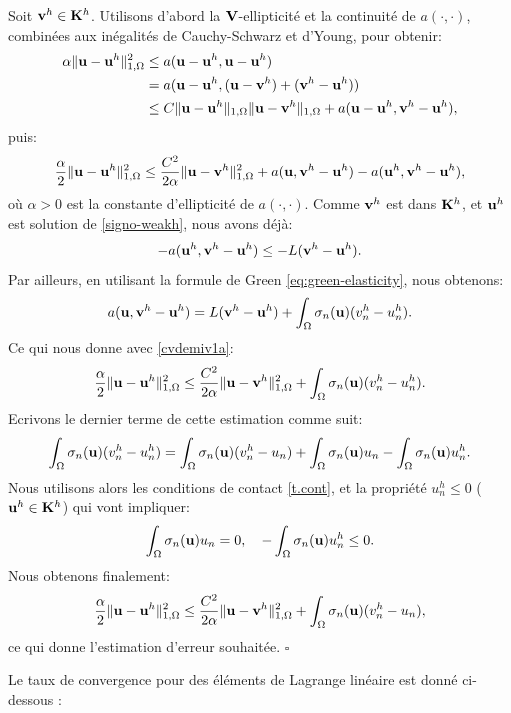 \documentclass[11pt]{book}
\newcommand{\cqfd}{{$\mbox{}$\hfill$\square$}}
\def\u{{\bf u}}
\def\vv{{\bf v}}
\def\V{{\bf V}}
\def\K{{\bf K}}
\begin{document}
\proof
Soit $\vv^h \in \K^h$. Utilisons d'abord la
$\V$-ellipticité et la continuité de $a(\cdot,\cdot)$, combinées aux inégalités de Cauchy-Schwarz et d'Young, pour obtenir:
\begin{align*}
\alpha \| \u - \u^h \|^2_{1,\Omega} &
\leq a ( \u - \u^h , \u - \u^h ) \nonumber \\
& =  a ( \u - \u^h , (\u - \vv^h) + (\vv^h - \u^h) ) \nonumber \\
& \leq C \| \u - \u^h \|_{1,\Omega} \| \u - \vv^h \|_{1,\Omega} + a ( \u - \u^h , \vv^h - \u^h ), %
\end{align*}
puis:
\begin{equation}
\frac\alpha2 \| \u - \u^h \|^2_{1,\Omega} 
\leq %
\frac{C^2}{2\alpha} \| \u - \vv^h \|^2_{1,\Omega}
 + a ( \u  , \vv^h - \u^h )
 - a ( \u^h , \vv^h - \u^h ), \label{cvdemiv1a}
\end{equation}
où $\alpha > 0$ est la constante d'ellipticité de $a(\cdot,\cdot)$. 
Comme $\vv^h$ est dans $\K^h$, et $\u^h$ est solution de \eqref{signo-weakh}, nous avons déjà:
 \[
  - a ( \u^h, \vv^h - \u^h) \leq - L ( \vv^h - \u^h). 
 \]
Par ailleurs, en utilisant la formule de Green \eqref{eq:green-elasticity}, nous obtenons:
 \[
  a ( \u , \vv^h - \u^h) = L ( \vv^h - \u^h) + \int_\Omega \sigma_n (\u) ( v^h_n - u^h_n).
 \]
Ce qui nous donne avec \eqref{cvdemiv1a}: 
\[
 \frac\alpha2 \| \u - \u^h \|^2_{1,\Omega} 
\leq 
\frac{C^2}{2\alpha} \| \u - \vv^h \|^2_{1,\Omega}
+ \int_\Omega \sigma_n (\u) ( v^h_n - u^h_n). 
\]
Ecrivons le dernier terme de cette estimation comme suit:
 \[
  \int_\Omega \sigma_n (\u) ( v^h_n - u^h_n) =
  \int_\Omega \sigma_n (\u) ( v^h_n - u_n) + \int_\Omega \sigma_n (\u) u_n
  - \int_\Omega \sigma_n (\u)  u^h_n.
 \]
Nous utilisons alors les conditions de contact \eqref{t.cont}, et la propriété $u^h_n \leq 0$ ($\u^h \in \K^h$) qui vont impliquer:
\[
 \int_\Omega \sigma_n (\u) u_n = 0, \quad - \int_\Omega \sigma_n (\u)  u^h_n \leq 0.
\]
Nous obtenons finalement:
\[
 \frac\alpha2 \| \u - \u^h \|^2_{1,\Omega} 
\leq 
\frac{C^2}{2\alpha} \| \u - \vv^h \|^2_{1,\Omega}
+ \int_\Omega \sigma_n (\u) ( v^h_n - u_n),
\]
ce qui donne l'estimation d'erreur souhaitée. \cqfd

\medskip

Le taux de convergence pour des éléments de Lagrange linéaire est donné ci-dessous :
\end{document}
